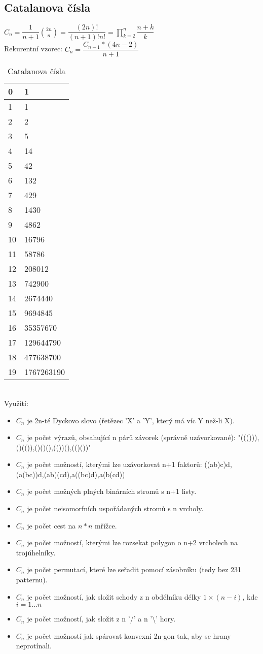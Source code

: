 \documentclass[11pt]{article}
\begin{document}
\subsection{Catalanova čísla}
$C_n=\dfrac{1}{n+1}{2n\choose n}=\dfrac{(2n)!}{(n+1)!n!}=\prod_{k=2}^n{\dfrac{n+k}{k}}$
\\Rekurentní vzorec: $C_n=\dfrac{C_{n-1}*(4n-2)}{n+1}$
\begin{table}[h]
\centering
\caption{Catalanova čísla}
\begin{tabular}{|l|l|}
\hline
0&1\\ \hline
1&1\\ \hline
2&2\\ \hline
3&5\\ \hline
4&14\\ \hline
5&42\\ \hline
6&132\\ \hline
7&429\\ \hline
8&1430\\ \hline
9&4862\\ \hline
10&16796\\ \hline
11&58786\\ \hline
12&208012\\ \hline
13&742900\\ \hline
14&2674440\\ \hline
15&9694845\\ \hline
16&35357670\\ \hline
17&129644790\\ \hline
18&477638700\\ \hline
19&1767263190\\ \hline
\end{tabular}
\end{table}
\\Využití:
\begin{itemize}
\item $C_n$ je 2n-té Dyckovo slovo (řetězec 'X' a 'Y', který má víc Y než-li X).
\item $C_n$ je počet výrazů, obsahující n párů závorek (správně uzávorkované):
 "((())),()(()),()()(),(())(),(()())"
\item $C_n$ je počet možností, kterými lze uzávorkovat n+1 faktorů: ((ab)c)d,(a(bc))d,(ab)(cd),a((bc)d),a(b(cd))
\item $C_n$ je počet možných plných binárních stromů s n+1 listy.
\item $C_n$ je počet neisomorfních uspořádaných stromů s n vrcholy.
\item $C_n$ je počet cest na $n*n$ mřížce.
\item $C_n$ je počet možností, kterými lze rozsekat polygon o n+2 vrcholech na trojúhelníky.
\item $C_n$ je počet permutací, které lze seřadit pomocí zásobníku (tedy bez 231 patternu).
\item $C_n$ je počet možností, jak složit schody z n obdélníku délky $1\times (n-i)$, kde $i=1...n$
\item $C_n$ je počet možností, jak složit z n '/' a n '\textbackslash' hory.
\item $C_n$ je počet možností jak spárovat konvexní 2n-gon tak, aby se hrany neprotínali.
\end{itemize}
\end{document}

